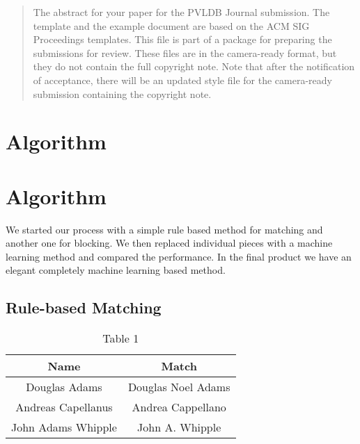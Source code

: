 \documentclass{vldb}
\begin{document}
\date{30 July 1999}


\maketitle

\begin{abstract}
The abstract for your paper for the PVLDB Journal submission.
The template and the example document are based on the ACM SIG Proceedings  templates. This file is part of a package for preparing the submissions for review. These files are in the camera-ready format, but they do not contain the full copyright note.
Note that after the notification of acceptance, there will be an updated style file for the camera-ready submission containing the copyright note.
\end{abstract}



\section{Algorithm}


\section{Algorithm}
We started our process with a simple rule based method for matching and another one for blocking. We then replaced individual pieces with a machine learning method and compared the performance. In the final product we have an elegant completely machine learning based method.

\subsection{Rule-based Matching}
\begin{table}
\centering
\caption{Table 1}
\begin{tabular}{|c|c|} \hline
Name&Match\\ \hline
Douglas Adams&Douglas Noel Adams\\ \hline
Andreas Capellanus&Andrea Cappellano \\ \hline
John Adams Whipple&John A. Whipple \\
\hline\end{tabular}
\end{table}
\end{document}
